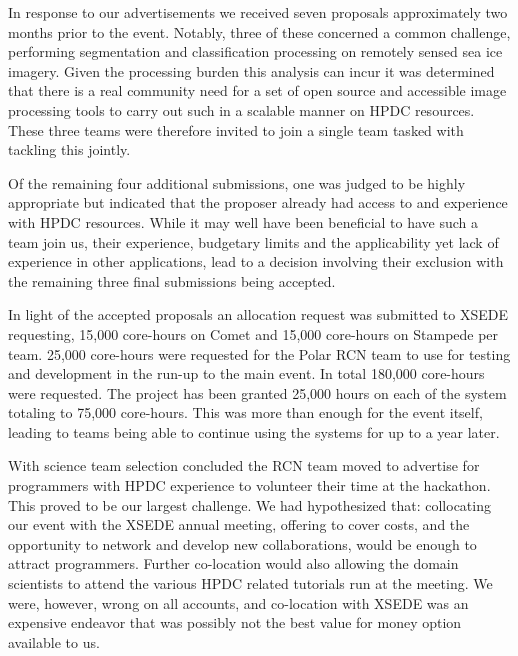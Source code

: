 \documentclass[conference]{IEEEtran}
\begin{document}
In response to our advertisements we received seven proposals approximately two months prior to the event. Notably, three of these concerned a common challenge, performing segmentation and classification processing on remotely sensed sea ice imagery. Given the processing burden this analysis can incur it was determined that there is a real community need for a set of open source and accessible image processing tools to carry out such in a scalable manner on HPDC resources.  These three teams were therefore invited to join a single team tasked with tackling this jointly.  

Of the remaining four additional submissions, one was judged to be highly appropriate but indicated that the proposer already had access to and experience with HPDC resources. While it may well have been beneficial to have such a team join us, their experience, budgetary limits and the applicability yet lack of experience in other applications, lead to a decision involving their exclusion with the remaining three final submissions being accepted.  

In light of the accepted proposals an allocation request was submitted to XSEDE requesting, 
15,000 core-hours on Comet and 15,000 core-hours on Stampede per team. 25,000 core-hours were requested for the Polar RCN team to use for testing and development in the run-up to the main event.  In total 180,000 core-hours were requested. The project has been granted 25,000 hours on each of the system totaling to 75,000 core-hours. This was more than enough for the event itself, leading to teams being able to continue using the systems for up to a year later.

With science team selection concluded the RCN team moved to advertise for programmers with HPDC experience to volunteer their time at the hackathon. This proved to be our largest challenge. We had hypothesized that: collocating our event with the XSEDE annual meeting, offering to cover costs, and the opportunity to network and develop new collaborations, would be enough to attract programmers.  Further co-location would also allowing the domain scientists to attend the various HPDC related tutorials run at the meeting.  We were, however, wrong on all accounts, and co-location with XSEDE was an expensive endeavor that was possibly not the best value for money option available to us.  

\end{document}
